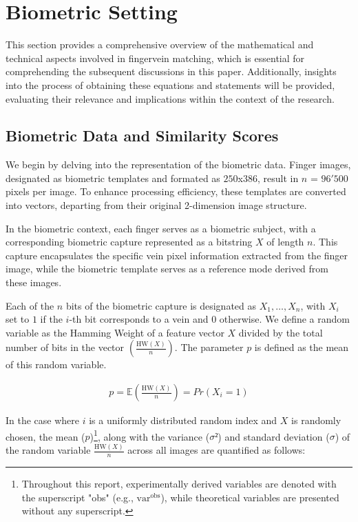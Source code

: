 
\section{Biometric Setting}
\label{sec:bio_setting}
This section provides a comprehensive overview of the mathematical and technical aspects involved in fingervein matching, which is essential for comprehending the subsequent discussions in this paper. Additionally, insights into the process of obtaining these equations and statements will be provided, evaluating their relevance and implications within the context of the research. 

\subsection{Biometric Data and Similarity Scores}
\label{Bio_data_sim_scores}
We begin by delving into the representation of the biometric data. Finger images, designated as biometric templates and formated as \(250\)x\(386\), result in \(n\) = \(96'500\) pixels per image. To enhance processing efficiency, these templates are converted into vectors, departing from their original 2-dimension image structure. 

In the biometric context, each finger serves as a biometric subject, with a corresponding biometric capture represented as a bitstring \(X\) of length \(n\). This capture encapsulates the specific vein pixel information extracted from the finger image, while the biometric template serves as a reference mode derived from these images. 

Each of the \(n\) bits of the biometric capture is designated as \(X_1, \ldots, X_n\), with \(X_i\) set to \(1\) if the \(i\)-th bit corresponds to a vein and \(0\) otherwise. We define a random variable as the Hamming Weight of a feature vector \(X\) divided by the total number of bits in the vector \(\left( \frac{\text{HW}(X)}{n} \right)\). The parameter \(p\) is defined as the mean of this random variable.

\begin{equation} \label{eq:p}
    \begin{aligned}
        p = \mathbb{E}\left( \frac{\text{HW}(X)}{n} \right) = Pr\left(X_i = 1\right)
    \end{aligned}
\end{equation}

In the case where \(i\) is a uniformly distributed random index and \(X\) is randomly chosen, the mean (\(p\))\footnote{Throughout this report, experimentally derived variables are denoted with the superscript "obs" (e.g., \(\text{var}^{\text{obs}}\)), while theoretical variables are presented without any superscript.}, along with the variance (\(\sigma²\)) and standard deviation (\(\sigma\)) of the random variable \(\frac{\text{HW}(X)}{n}\) across all images are quantified as follows:

